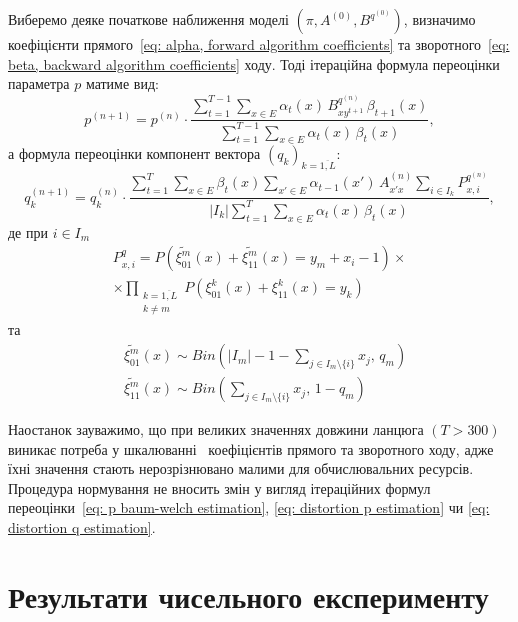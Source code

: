 \documentclass[]{iptconf}
\theoremstyle{plain}
\begin{document}
Виберемо деяке початкове наближення моделі $\left( \pi,A^{(0)},B^{q^{(0)}} \right)$, визначимо коефіцієнти прямого~\eqref{eq: alpha, forward algorithm coefficients} та зворотного~\eqref{eq: beta, backward algorithm coefficients} ходу. Тоді ітераційна формула переоцінки параметра $p$ матиме вид:
\begin{equation}\label{eq: distortion p estimation}
    p^{(n+1)} = p^{(n)}\cdot\frac{\sum\limits_{t=1}^{T-1}\sum\limits_{x \in E} \alpha_t(x)\,B^{q^{(n)}}_{xy^{t+1}}\,\beta_{t+1}(x)}{\sum\limits_{t=1}^{T-1}\sum\limits_{x \in E} \alpha_t(x)\,\beta_t(x)},
\end{equation}
а формула переоцінки компонент вектора $\left( q_k \right)_{k=\overline{1,L}}:$ 
\begin{equation}\label{eq: distortion q estimation}
    q_k^{(n+1)} = q_k^{(n)}\cdot\frac{\sum\limits_{t=1}^{T}\sum\limits_{x \in E}\beta_{t}(x)\sum\limits_{x' \in E} \alpha_{t-1}(x')\,A^{(n)}_{x'x}\sum\limits_{i \in I_k}P^{q^{(n)}}_{x,i}}{|I_k|\sum\limits_{t=1}^{T}\sum\limits_{x \in E} \alpha_t(x)\,\beta_t(x)},
\end{equation}
де при $i \in I_m$
\begin{multline*}
    P^{q}_{x,i} = P\left( \widetilde{\xi^m_{01}}(x) + \widetilde{\xi^m_{11}}(x) = y_m + x_i - 1 \right)  \times \\ 
    \times \prod\limits_{\substack{k = \overline{1,L} \\ k \neq m}} P\left( \xi^k_{01}(x) + \xi^k_{11}(x) = y_k \right)
\end{multline*}
та
\begin{align*}
    & \widetilde{\xi^m_{01}}(x) \sim Bin\left( |I_m| - 1 - \sum_{j \in I_m\setminus\{i\}} x_j,\, q_m \right) \\
    & \widetilde{\xi^m_{11}}(x) \sim Bin\left(\sum_{j \in I_m\setminus\{i\}} x_j,\, 1 - q_m \right)
\end{align*}

Наостанок зауважимо, що при великих значеннях довжини ланцюга $(T>300)$ виникає потреба у шкалюванні~\cite[розділ 5]{Nilsson2005} коефіцієнтів прямого та зворотного ходу, адже їхні значення стають нерозрізнювано малими для обчислювальних ресурсів. Процедура нормування не вносить змін у вигляд ітераційних формул переоцінки~\eqref{eq: p baum-welch estimation}, \eqref{eq: distortion p estimation} чи \eqref{eq: distortion q estimation}.

\section{Результати чисельного експерименту}
\setcounter{equation}{0}
\end{document}
